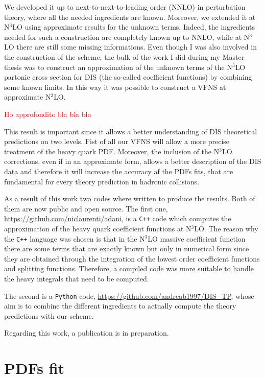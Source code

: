 \documentclass[11pt,a4paper]{moderncv}        %
\begin{document}
We developed it up to next-to-next-to-leading order (NNLO) in perturbation theory, where all the needed ingredients are known.
Moreover, we extended it at N$^3$LO using approximate results for the unknown terms.
Indeed, the ingredients needed for such a construction are completely known up to NNLO, while at N$^3$LO
there are still some missing informations.
Even though I was also involved in the construction of the scheme, the bulk of the work I did during my Master thesis was to
construct an approximation of the unknown terms of the N$^3$LO partonic cross section for DIS (the so-called coefficient functions) by
combining some known limits.
In this way it was possible to construct a VFNS at approximate N$^3$LO.

\textcolor{red}{Ho approfondito bla bla bla}

This result is important since it allows a better understanding of DIS theoretical predictions on two levels.
Fist of all our VFNS will allow a more precise treatment of the heavy quark PDF.
Moreover, the inclusion of the N$^3$LO corrections, even if in an approximate form, allows a better description of the DIS data
and therefore it will increase the accuracy af the PDFs fits, that are fundamental for every theory prediction in hadronic collisions.

As a result of this work two codes where written to produce the results.
Both of them are now public and open source.
The first one, \url{https://github.com/niclaurenti/adani}, is a \texttt{C++} code 
which computes the approximation of the heavy quark coefficient functions at N$^3$LO.
The reason why the \texttt{C++} language was chosen is that in the N$^3$LO massive coefficient function there are some terms that are
exactly known but only in numerical form since they are obtained through the integration of the lowest order coefficient functions and
splitting functions.
Therefore, a compiled code was more suitable to handle the heavy integrals that need to be computed.

The second is a \texttt{Python} code, \url{https://github.com/andreab1997/DIS_TP}, whose aim is to combine the different ingredients to actually
compute the theory predictions with our scheme.

Regarding this work, a publication is in preparation.

\section{PDFs fit}
\end{document}
